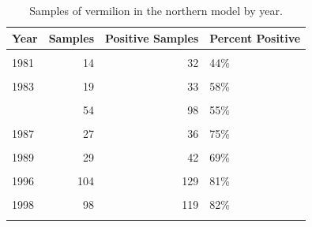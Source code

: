 \documentclass[11pt,
  english,
  a4paper,
]{article}
\begin{document}
\begin{table}

\caption{\label{tab:tab-year-mrfss}Samples of vermilion in the northern model by year.}
\centering
\begin{tabular}[t]{lrrl}
\toprule
Year & Samples & Positive Samples & Percent Positive\\
\midrule
\cellcolor{gray!6}{1980} & \cellcolor{gray!6}{31} & \cellcolor{gray!6}{57} & \cellcolor{gray!6}{54\%}\\
1981 & 14 & 32 & 44\%\\
\cellcolor{gray!6}{1982} & \cellcolor{gray!6}{24} & \cellcolor{gray!6}{41} & \cellcolor{gray!6}{59\%}\\
1983 & 19 & 33 & 58\%\\
\cellcolor{gray!6}{1984} & \cellcolor{gray!6}{34} & \cellcolor{gray!6}{59} & \cellcolor{gray!6}{58\%}\\
\addlinespace
1985 & 54 & 98 & 55\%\\
\cellcolor{gray!6}{1986} & \cellcolor{gray!6}{50} & \cellcolor{gray!6}{87} & \cellcolor{gray!6}{57\%}\\
1987 & 27 & 36 & 75\%\\
\cellcolor{gray!6}{1988} & \cellcolor{gray!6}{38} & \cellcolor{gray!6}{48} & \cellcolor{gray!6}{79\%}\\
1989 & 29 & 42 & 69\%\\
\addlinespace
\cellcolor{gray!6}{1995} & \cellcolor{gray!6}{31} & \cellcolor{gray!6}{41} & \cellcolor{gray!6}{76\%}\\
1996 & 104 & 129 & 81\%\\
\cellcolor{gray!6}{1997} & \cellcolor{gray!6}{127} & \cellcolor{gray!6}{162} & \cellcolor{gray!6}{78\%}\\
1998 & 98 & 119 & 82\%\\
\cellcolor{gray!6}{1999} & \cellcolor{gray!6}{82} & \cellcolor{gray!6}{99} & \cellcolor{gray!6}{83\%}\\
\bottomrule
\end{tabular}
\end{table}

\FloatBarrier
\end{document}
